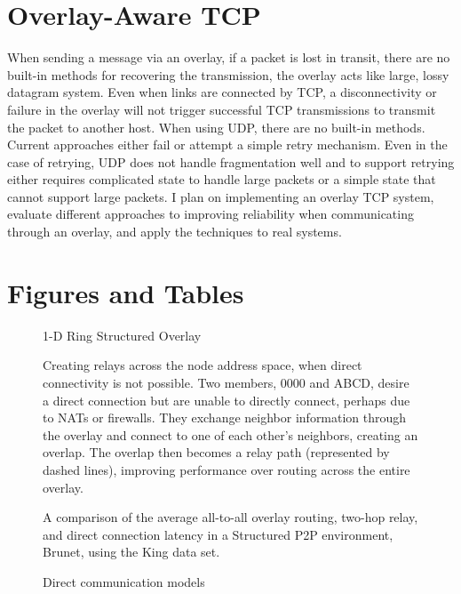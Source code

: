 \section{Overlay-Aware TCP}
When sending a message via an overlay, if a packet is lost in transit, there
are no built-in methods for recovering the transmission, the overlay acts like
large, lossy datagram system.  Even when links are connected by TCP, a
disconnectivity or failure in the overlay will not trigger successful TCP
transmissions to transmit the packet to another host.  When using UDP, there
are no built-in methods.  Current approaches either fail or attempt a simple
retry mechanism.  Even in the case of retrying, UDP does not handle
fragmentation well and to support retrying either requires complicated state to
handle large packets or a simple state that cannot support large packets.  I
plan on implementing an overlay TCP system, evaluate different approaches to
improving reliability when communicating through an overlay, and apply the
techniques to real systems.

\section{Figures and Tables}

\begin{figure}[ht]
\centering
{}
\caption{1-D Ring Structured Overlay}
\label{fig:ring_overlay}
\end{figure}

\begin{figure}[ht]
\centering
{}
\caption[Proactive relay creation]{Creating relays across the node address
space, when direct connectivity is not possible.  Two members, 0000 and ABCD, 
desire a direct connection but are unable to directly connect, perhaps due to
NATs or firewalls.  They exchange neighbor information through the overlay and
connect to one of each other's neighbors, creating an overlap.  The overlap
then becomes a relay path (represented by dashed lines), improving performance
over routing across the entire overlay.}
\label{fig:relay}
\end{figure}

\begin{figure}[ht]
\centering
{}
\caption[Relay evaluation]{A comparison of the average all-to-all overlay
routing, two-hop relay, and direct connection latency in a Structured P2P
environment, Brunet, using the King data set.}
\label{fig:simulated_relays}
\end{figure}

\begin{figure}[ht]
\centering
\caption{Direct communication models}
\label{fig:direct_communication}
\end{figure}

\begin{table}[ht]
\caption{VN Stack Comparison}
\label{tab:vpn_eval_comp}
\centering
\end{table}

